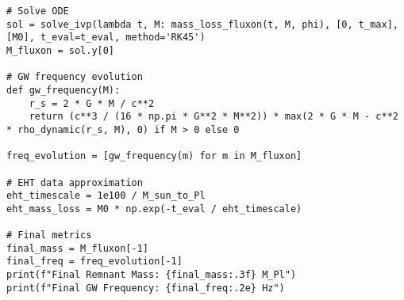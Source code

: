\documentclass{article}
\begin{document}
\begin{lstlisting}
# Solve ODE
sol = solve_ivp(lambda t, M: mass_loss_fluxon(t, M, phi), [0, t_max], [M0], t_eval=t_eval, method='RK45')
M_fluxon = sol.y[0]

# GW frequency evolution
def gw_frequency(M):
    r_s = 2 * G * M / c**2
    return (c**3 / (16 * np.pi * G**2 * M**2)) * max(2 * G * M - c**2 * rho_dynamic(r_s, M), 0) if M > 0 else 0

freq_evolution = [gw_frequency(m) for m in M_fluxon]

# EHT data approximation
eht_timescale = 1e100 / M_sun_to_Pl
eht_mass_loss = M0 * np.exp(-t_eval / eht_timescale)

# Final metrics
final_mass = M_fluxon[-1]
final_freq = freq_evolution[-1]
print(f"Final Remnant Mass: {final_mass:.3f} M_Pl")
print(f"Final GW Frequency: {final_freq:.2e} Hz")
\end{lstlisting}
\end{document}
